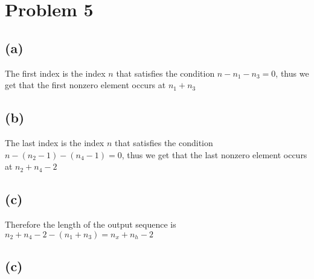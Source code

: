 \section*{Problem 5}
\subsection*{(a)}
The first index is the index $n$ that satisfies the condition 
$n-n_1-n_3=0$, thus we get that the first nonzero element occurs at $\boxed{n_1+n_3}$
\subsection*{(b)}
The last index is the index $n$ that satisfies the condition
$n-(n_2-1)-(n_4-1)=0$, thus we get that the last nonzero element occurs at $\boxed{n_2+n_4-2}$
\subsection*{(c)}
Therefore the length of the output sequence is 
$n_2+n_4-2-(n_1+n_3)=\boxed{n_x+n_h-2}$
\subsection*{(c)}





